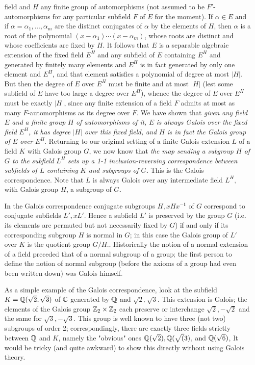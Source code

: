 \documentclass[10pt]{article}
\begin{document}
field and $H$ any finite group of automorphisms (not assumed to be
$F'$-automorphisms for any particular subfield $F$ of $E$ for the
moment). If $\alpha\in E$ and if $\alpha=\alpha_1,\ldots,\alpha_m$ are
the distinct conjugates of $\alpha$ by the elements of $H$, then
$\alpha$ is a root of the polynomial $(x-\alpha_1)\cdots(x-\alpha_m)$,
whose roots are distinct and whose coefficients are fixed by $H$. It
follows that $E$ is a separable algebraic extension of the fixed field
$E^H$ and any subfield of $E$ containing $E^H$ and generated by finitely
many elements and $E^H$ is in fact generated by only one element and
$E^H$, and that element satisfies a polynomial of degree at most $|H|$.
But then the degree of $E$ over $E^H$ must be finite and at most $|H|$
(lest some subfield of $E$ have too large a degree over $E^H$), whence
the degree of $E$ over $E^H$ must be exactly $|H|$, since any finite
extension of a field $F$ admits at most as many $F$-automorphisms as its
degree over $F$. We have shown that {\sl given any field $E$ and a
  finite group $H$ of automorphisms of it, $E$ is always Galois over the
  fixed field $E^H$, it has degree $|H|$ over this fixed field, and $H$
  is in fact the Galois group of $E$ over $E^H$}. Returning to our
original setting of a finite Galois extension $L$ of a field $K$ with
Galois group $G$, we now know that {\sl the map sending a subgroup $H$
  of $G$ to the subfield $L^H$ sets up a 1-1 inclusion-reversing
  correspondence between subfields of $L$ containing $K$ and subgroups
  of $G$}. This is the Galois correspondence. Note that $L$ is always
Galois over any intermediate field $L^H$, with Galois group $H$, a
subgroup of $G$.

In the Galois correspondence conjugate subgroups $H,xHx^{-1}$ of $G$
correspond to conjugate subfields $L',xL'$. Hence a subfield $L'$ is
preserved by the group $G$ (i.e. its elements are permuted but not
necessarily fixed by $G$) if and only if its corresponding subgroup $H$
is normal in $G$; in this case the Galois group of $L'$ over $K$ is the
quotient group $G/H$.. Historically the notion of a normal extension of
a field preceded that of a normal subgroup of a group; the first person
to define the notion of normal subgroup (before the axioms of a group
had even been written down) was Galois himself.

As a simple example of the Galois correspondence, look at the subfield
$K=\Bbb Q(\sqrt{2},\sqrt{3})$ of $\Bbb C$ generated by $\Bbb Q$ and
$\sqrt{2},\sqrt{3}$. This extension is Galois; the elements of the
Galois group $\Bbb Z_2\times\Bbb Z_2$ each preserve or interchange
$\sqrt{2},-\sqrt{2}$ and the same for $\sqrt{3},-\sqrt{3}$. This group
is well known to have three (not two) subgroups of order 2;
correspondingly, there are exactly three fields strictly between $\Bbb
Q$ and $K$, namely the "obvious" ones $\Bbb Q(\sqrt{2}),\Bbb
Q(\sqrt(3)$, and $\Bbb Q(\sqrt{6})$, It would be tricky (and quite
awkward) to show this directly without using Galois theory.
\end{document}
